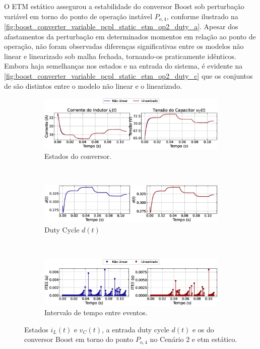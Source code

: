 O ETM estático assegurou a estabilidade do conversor Boost sob perturbação variável em torno do ponto de operação instável $P_{o, 4}$, conforme ilustrado na \autoref{fig:boost_converter_variable_pcpl_static_etm_op2_duty_a}. Apesar dos afastamentos da perturbação em determinados momentos em relação ao ponto de operação, não foram observadas diferenças significativas entre os modelos não linear e linearizado sob malha fechada, tornando-os praticamente idênticos. Embora haja semelhanças nos estados e na entrada do sistema, é evidente na \autoref{fig:boost_converter_variable_pcpl_static_etm_op2_duty_c} que os conjuntos de  são distintos entre o modelo não linear e o linearizado.

\begin{figure}[H]
  \centering
  \captionsetup{justification=centering}
  \begin{subfigure}{1.\textwidth}
    \centering
    \includegraphics[width=1.\textwidth]{figuras/static-etm/boost/sim2/op2/result.eps}
    \caption{Estados do conversor.}
    \label{fig:boost_converter_variable_pcpl_static_etm_op2_duty_a}
  \end{subfigure}
  \\[6pt]
  \begin{subfigure}{1.\textwidth}
    \centering
    \includegraphics[width=1.\textwidth]{figuras/static-etm/boost/sim2/op2/duty-cycle.eps}
    \caption{Duty Cycle $d(t)$}
    \label{fig:boost_converter_variable_pcpl_static_etm_op2_duty_b}
  \end{subfigure}
  \\[6pt]
  \begin{subfigure}{1.\textwidth}
    \centering
    \includegraphics[width=1.\textwidth]{figuras/static-etm/boost/sim2/op2/inter-event-times.eps}
    \caption{Intervalo de tempo entre eventos.}
    \label{fig:boost_converter_variable_pcpl_static_etm_op2_duty_c}
  \end{subfigure}
  \caption{Estados $i_L(t)$ e $v_C(t)$, a entrada duty cycle $d(t)$ e os  do conversor Boost em torno do ponto $P_{\mathrm{o}, 4}$ no Cenário 2 e \acrshort{etm} estático.}
\end{figure}

